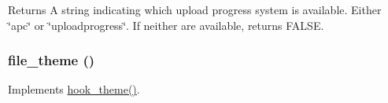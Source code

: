 \begin{DoxyReturn}{Returns}
A string indicating which upload progress system is available. Either \char`\"{}apc\char`\"{} or \char`\"{}uploadprogress\char`\"{}. If neither are available, returns FALSE. 
\end{DoxyReturn}
\hypertarget{file_8module_a073bfda14a6169090471f7b93980d518}{
\subsubsection[{file\_\-theme}]{\setlength{\rightskip}{0pt plus 5cm}file\_\-theme ()}}
\label{file_8module_a073bfda14a6169090471f7b93980d518}
Implements \hyperlink{group__hooks_ga013ccb45c7aaab1c16cf9691428c910d}{hook\_\-theme()}. 